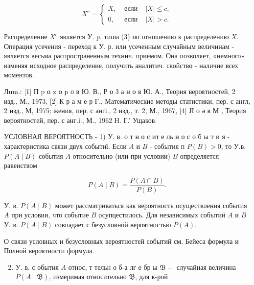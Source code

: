 \documentclass[10pt]{article}
\begin{document}
\[

X^{c}=\left\{\begin{array}{lll}

X, & \text { если } & |X| \leqslant c, \\

0, & \text { если } & |X|>c .

\end{array}\right.

\]



Распределение $X^{c}$ является У. р. тиша (3) по отношению к распределению $X$. Операция усечения - переход к У. р. или усеченным случайным величинам - является весьма распространенным технич. приемом. Она позволяет, «немного» изменяя исходное распределение, получить аналитич. своӥство - наличие всех моментов.



Лum.: [1] П p о $\mathrm{x}$ о $\mathrm{p}$ о в Ю. В., Р о 3 а н о в Ю. А., Теория вероятностей, 2 изд., М., 1973, [2] К р а м е р Г., Математические методы статистики, пер. с англ, 2 изд., М, 1975; жения, пер. с ангі., 2 изд., т. 2, М., 1967, [4] ЈІ о ә в М , Теория вероятностей, пер. с анг.і., М., 1962 Н. Г.' Ущаков.



УСЛОВНАЯ ВЕРОЯТНОСТЬ - 1) У. в. о т н о с ит е ль н о с о б ы т и я - характеристика связи двух событиї. Если $A$ и $B$ - события п $P(B)>0$, то У.в. $P(A \mid B)$ события $A$ относительно (или при условии) $B$ определяется равенством



\[

P(A \mid B)=\frac{P(A \cap B)}{P(B)} .

\]



У. в. $P(A \mid B)$ может рассматриваться как вероятность осуществления события $A$ при условии, что событие $B$ осупцестилось. Для независимых событиӥ $A$ и $B$ У. в. $P(A \mid B)$ совпадает с безусловной вероятностью $P(A)$.



О связи условных и безусловных вероятностей событий см. Бейеса формула и Полной вероятиости формула.



\begin{enumerate}

  \setcounter{enumi}{1}

  \item У. в. с обытия $A$ относ, т тельн о б-а лг е бр ы $\mathfrak{B}-$ случайная величина $P(A \mid \mathfrak{B})$, измеримая относительно $\mathfrak{B}$, для к-рой

\end{enumerate}
\end{document}
